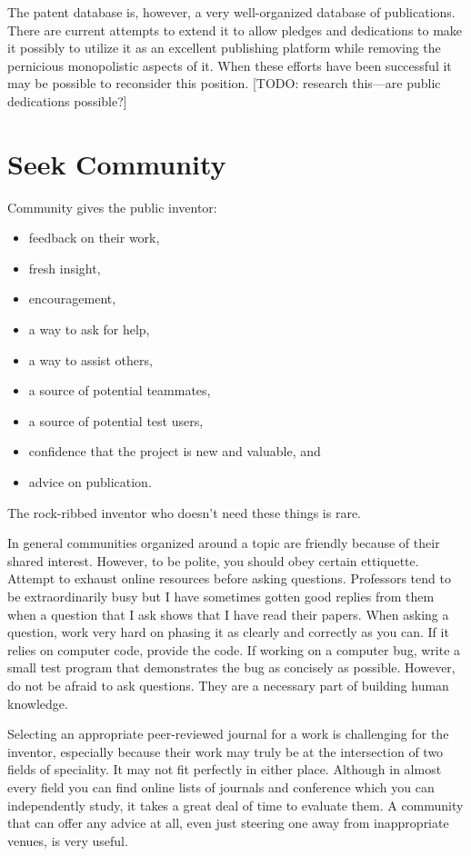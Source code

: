 \documentclass[
	fontsize=10pt, %
	twoside=false, %
	secnumdepth=1, %
]{kaobook}
\begin{document}
The patent database is, however, a very well-organized database of publications.
There are current attempts to extend it to allow pledges and dedications to make
it possibly to utilize it as an excellent publishing platform while removing the
pernicious monopolistic aspects of it.
When these efforts have been successful it may be possible to reconsider this position.
[TODO: research this---are public dedications possible?]

\section{Seek Community}

Community gives the public inventor:
\begin{itemize}
\item feedback on their work,
\item fresh insight,
\item encouragement,
\item a way to ask for help,
  \item a way to assist others,
\item a source of potential teammates,
\item a source of potential test users,
\item confidence that the project is new and valuable, and
\item advice on publication.
\end{itemize}

The rock-ribbed inventor who doesn't need these things is rare.

In general communities organized around a topic are friendly
because of their shared interest.
However, to be polite, you should obey certain ettiquette.
Attempt to exhaust online resources before asking questions.
Professors tend to be extraordinarily busy but I have sometimes gotten good
replies from them when a question that I ask shows that I have read
their papers.
When asking a question, work very hard on phasing it as clearly and
correctly as you can. If it relies on computer code, provide the code.
If working on a computer bug, write a small test program that demonstrates
the bug as concisely as possible.
However, do not be afraid to ask questions.
They are a necessary part of building human knowledge.

Selecting an appropriate peer-reviewed journal for a work is
challenging for the inventor, especially because their work may
truly be at the intersection of two fields of speciality. It may
not fit perfectly in either place.
Although in almost every field you can find online lists of journals
and conference which you can independently study, it takes a great
deal of time to evaluate them.
A community that can offer any advice at all, even just steering one
away from inappropriate venues, is very useful.
\end{document}
